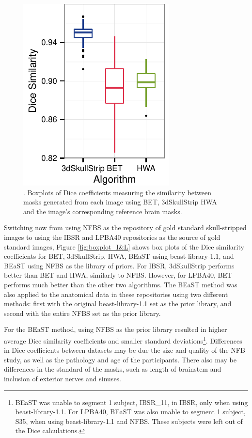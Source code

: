 \begin{figure}[h!]
    \includegraphics[]{boxplot_nfbs.pdf}
    \caption{. Boxplots of Dice coefficients measuring the similarity between masks generated from each image using BET, 3dSkullStrip HWA and the image's corresponding reference brain masks. }
    \label{fig:boxplot_NFBS}
\end{figure}

Switching now from using NFBS as the repository of gold standard skull-stripped images to using the IBSR and LPBA40 repositories as the source of gold standard images, Figure \ref{fig:boxplot_I&L} shows box plots of the Dice similarity coefficients for BET, 3dSkullStrip, HWA, BEaST using beast-library-1.1, and BEaST using NFBS as the library of priors. For IBSR, 3dSkullStrip performs better than BET and HWA, similarly to NFBS. However, for LPBA40, BET performs much better than the other two algorithms. The BEaST method was also applied to the anatomical data in these repositories using two different methods: first with the original beast-library-1.1 set as the prior library, and second with the entire NFBS set as the prior library.

For the BEaST method, \DIFdelbegin {}\DIFdelend using NFBS as the prior library resulted in higher average Dice similarity coefficients and smaller standard deviations\footnote{BEaST was unable to segment 1 subject, IBSR\_11, in IBSR, only when using beast-library-1.1. For LPBA40, BEaST was also unable to segment 1 subject, S35, when using beast-library-1.1 and NFBS. These subjects were left out of the Dice calculations.}. Differences in Dice coefficients between datasets may be due the size and quality of the NFB study, as well as the pathology and age of the participants. \DIFaddbegin {}\DIFaddend There also may be differences in the standard of the masks, such as length of brainstem and inclusion of exterior nerves and sinuses.

